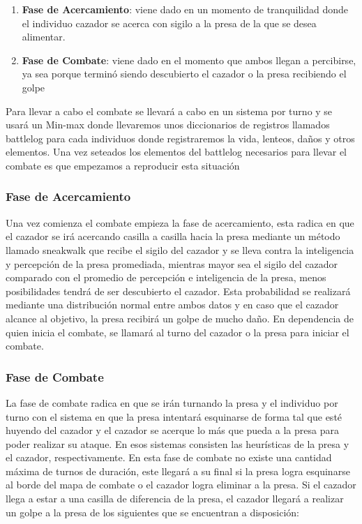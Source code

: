\documentclass{llncs}
\begin{document}
\begin{enumerate}
	\item \textbf{Fase de Acercamiento}: viene dado en un momento de tranquilidad donde el individuo cazador se acerca con sigilo a la presa de la que se desea alimentar.
	\item \textbf{Fase de Combate}: viene dado en el momento que ambos llegan a percibirse, ya sea porque terminó siendo descubierto el cazador o la presa recibiendo el golpe
\end{enumerate}

Para llevar a cabo el combate se llevará a cabo en un sistema por turno y se usará un Min-max donde llevaremos unos diccionarios de registros llamados battlelog para cada individuos donde registraremos la vida, lenteos, daños y otros elementos. Una vez seteados los elementos del battlelog necesarios para llevar el combate es que empezamos a reproducir esta situación


\subsubsection{Fase de Acercamiento}
Una vez comienza el combate empieza la fase de acercamiento, esta radica en que el cazador se irá acercando casilla a casilla hacia la presa mediante un método llamado sneakwalk que recibe el sigilo del cazador y se lleva contra la inteligencia y percepción de la presa promediada, mientras mayor sea el sigilo del cazador comparado con el promedio de percepción e inteligencia de la presa, menos posibilidades tendrá de ser descubierto el cazador. Esta probabilidad se realizará mediante una distribución normal entre ambos datos y en caso que el cazador alcance al objetivo, la presa recibirá un golpe de mucho daño.
\newline
\newline
En dependencia de quien inicia el combate, se llamará al turno del cazador o la presa para iniciar el combate.

\subsubsection{Fase de Combate}
La fase de combate radica en que se irán turnando la presa y el individuo por turno con el sistema en que la presa intentará esquinarse de forma tal que esté huyendo del cazador y el cazador se acerque lo más que pueda a la presa para poder realizar su ataque. En esos sistemas consisten las heurísticas de la presa y el cazador, respectivamente.
\newline
\newline
En esta fase de combate no existe una cantidad máxima de turnos de duración, este llegará a su final si la presa logra esquinarse al borde del mapa de combate o el cazador logra eliminar a la presa.
\newline
\newline
Si el cazador llega a estar a una casilla de diferencia de la presa, el cazador llegará a realizar un golpe a la presa de los siguientes que se encuentran a disposición:
\end{document}
